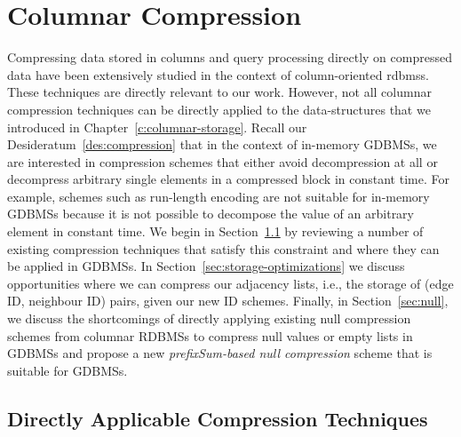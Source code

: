 \chapter{Columnar Compression}
\label{columnar-compression}

Compressing data stored in columns and query processing directly on compressed data have been extensively studied in the context of column-oriented \gls{rdbms}s. 
These techniques are directly relevant to our work. However, not all columnar compression techniques can be directly applied to the data-structures that we introduced in Chapter~\ref{c:columnar-storage}. Recall our Desideratum~\ref{des:compression} that in the context of in-memory GDBMSs, we are interested in compression schemes that either avoid decompression at all or decompress arbitrary single elements in a compressed block in constant time. For example, schemes such as run-length encoding are not suitable for in-memory GDBMSs because it is not possible to decompose the value of an arbitrary element in constant time. We begin in Section~\ref{sec:col-existing} by reviewing a number of existing compression techniques that satisfy this constraint and where they can be applied in GDBMSs. In Section~\ref{sec:storage-optimizations} we discuss opportunities where we can compress our adjacency lists, i.e., the storage of (edge ID, neighbour ID) pairs, given our new ID schemes. Finally, in Section~\ref{sec:null}, we discuss the shortcomings of directly applying existing null compression schemes from columnar RDBMSs to compress null values or empty lists in GDBMSs and propose a new \emph{prefixSum-based null compression} scheme that is suitable for GDBMSs.

\section{Directly Applicable Compression Techniques}
\label{sec:col-existing}

